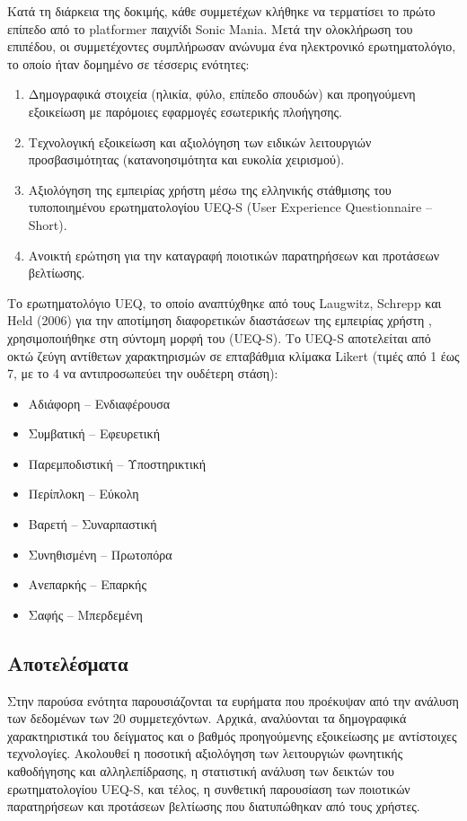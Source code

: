 \documentclass[twoside, a4paper, 11pt]{article}
\newcommand{\textlatin}[1]{\textenglish{#1}}
\begin{document}
Κατά τη διάρκεια της δοκιμής, κάθε συμμετέχων κλήθηκε να τερματίσει το πρώτο επίπεδο από το platformer παιχνίδι \textlatin{Sonic Mania}. Μετά την ολοκλήρωση του επιπέδου, οι συμμετέχοντες συμπλήρωσαν ανώνυμα ένα ηλεκτρονικό ερωτηματολόγιο, το οποίο ήταν δομημένο σε τέσσερις ενότητες:
\begin{enumerate}
    \item Δημογραφικά στοιχεία (ηλικία, φύλο, επίπεδο σπουδών) και προηγούμενη εξοικείωση με παρόμοιες εφαρμογές εσωτερικής πλοήγησης.
    \item Τεχνολογική εξοικείωση και αξιολόγηση των ειδικών λειτουργιών προσβασιμότητας (κατανοησιμότητα και ευκολία χειρισμού).
    \item Αξιολόγηση της εμπειρίας χρήστη μέσω της ελληνικής στάθμισης του τυποποιημένου ερωτηματολογίου \textlatin{UEQ-S} (\textlatin{User Experience Questionnaire – Short}).
    \item Ανοικτή ερώτηση για την καταγραφή ποιοτικών παρατηρήσεων και προτάσεων βελτίωσης.
\end{enumerate}

Το ερωτηματολόγιο \textlatin{UEQ}, το οποίο αναπτύχθηκε από τους \textlatin{Laugwitz, Schrepp} και \textlatin{Held} (2006) για την αποτίμηση διαφορετικών διαστάσεων της εμπειρίας χρήστη \cite{laugwitz2008construction}, χρησιμοποιήθηκε στη σύντομη μορφή του (\textlatin{UEQ-S}). Το \textlatin{UEQ-S} αποτελείται από οκτώ ζεύγη αντίθετων χαρακτηρισμών σε επταβάθμια κλίμακα \textlatin{Likert} (τιμές από 1 έως 7, με το 4 να αντιπροσωπεύει την ουδέτερη στάση):
\begin{itemize}
    \item Αδιάφορη -- Ενδιαφέρουσα
    \item Συμβατική -- Εφευρετική
    \item Παρεμποδιστική -- Υποστηρικτική
    \item Περίπλοκη -- Εύκολη
    \item Βαρετή -- Συναρπαστική
    \item Συνηθισμένη -- Πρωτοπόρα
    \item Ανεπαρκής -- Επαρκής
    \item Σαφής -- Μπερδεμένη
\end{itemize}

\subsection{Αποτελέσματα}

Στην παρούσα ενότητα παρουσιάζονται τα ευρήματα που προέκυψαν από την ανάλυση των δεδομένων των 20 συμμετεχόντων. Αρχικά, αναλύονται τα δημογραφικά χαρακτηριστικά του δείγματος και ο βαθμός προηγούμενης εξοικείωσης με αντίστοιχες τεχνολογίες. Ακολουθεί η ποσοτική αξιολόγηση των λειτουργιών φωνητικής καθοδήγησης και αλληλεπίδρασης, η στατιστική ανάλυση των δεικτών του ερωτηματολογίου \textlatin{UEQ-S}, και τέλος, η συνθετική παρουσίαση των ποιοτικών παρατηρήσεων και προτάσεων βελτίωσης που διατυπώθηκαν από τους χρήστες.
\end{document}

